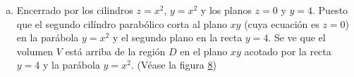 \documentclass[12pt]{exam}
\begin{document}
\begin{questions}
\begin{enumerate}[a)]
  \item Encerrado por los cilindros $z=x^2$, $y=x^2$ y los planos $z=0$ y $y=4$.
    Puesto que el segundo cilíndro parabólico corta al plano $xy$ (cuya ecuación es $z=0$) en la parábola $y=x^2$ y el segundo plano en la recta $y=4$. Se ve que el volumen $V$ está arriba de la región $D$ en el plano $xy$ acotado por la recta $y=4$ y la parábola $y=x^2$. (Véase la figura \hyperref[fig:5regionb]{8})
    \begin{figure}[H]
      \centering
\end{figure}
\end{enumerate}
\end{questions}
\end{document}
